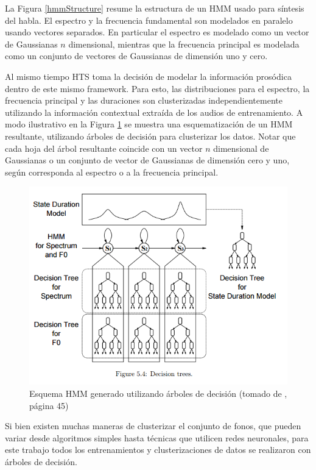 La Figura \ref{hmmStructure} resume la estructura de un HMM usado para síntesis del habla. El espectro y la frecuencia fundamental son modelados en paralelo usando vectores separados. En particular el espectro es modelado como un vector de Gaussianas $n$ dimensional, mientras que la frecuencia principal es modelada como un conjunto de vectores de Gaussianas de dimensión uno y cero.

Al mismo tiempo HTS toma la decisión de modelar la información prosódica dentro de este mismo framework. Para esto, las distribuciones para el espectro, la frecuencia principal y las duraciones son clusterizadas independientemente utilizando la información contextual extraída de los audios de entrenamiento. A modo ilustrativo en la Figura \ref{hmmTree} se muestra una esquematización de un HMM resultante, utilizando árboles de decisión para clusterizar los datos. Notar que cada hoja del árbol resultante coincide con un vector $n$ dimensional de Gaussianas o un conjunto de vector de Gaussianas de dimensión cero y uno, según corresponda al espectro o a la frecuencia principal.

\begin{figure}
\includegraphics[scale=0.5]{imagenes/hmmContext.png}
\caption{Esquema HMM generado utilizando árboles de decisión (tomado de \cite{phoneticAndProsodic}, página 45)}
\label{hmmTree}
\centering
\end{figure}

Si bien existen muchas maneras de clusterizar el conjunto de fonos, que pueden variar desde algoritmos simples hasta técnicas que utilicen redes neuronales, para este trabajo todos los entrenamientos y clusterizaciones de datos se realizaron con árboles de decisión. 

